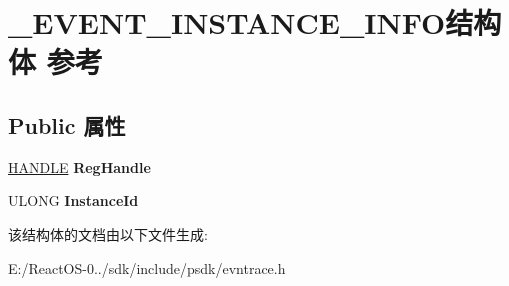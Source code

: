 \hypertarget{struct___e_v_e_n_t___i_n_s_t_a_n_c_e___i_n_f_o}{}\section{\+\_\+\+E\+V\+E\+N\+T\+\_\+\+I\+N\+S\+T\+A\+N\+C\+E\+\_\+\+I\+N\+F\+O结构体 参考}
\label{struct___e_v_e_n_t___i_n_s_t_a_n_c_e___i_n_f_o}
\subsection*{Public 属性}
\begin{DoxyCompactItemize}
\item 
\mbox{\label{struct___e_v_e_n_t___i_n_s_t_a_n_c_e___i_n_f_o_a291506bba725bff337ba5aabd95eb3f1}} 
\hyperlink{interfacevoid}{H\+A\+N\+D\+LE} {\bfseries Reg\+Handle}
\item 
\mbox{\label{struct___e_v_e_n_t___i_n_s_t_a_n_c_e___i_n_f_o_a77785ca241719cfc0c6a6c058636a916}} 
U\+L\+O\+NG {\bfseries Instance\+Id}
\end{DoxyCompactItemize}


该结构体的文档由以下文件生成\+:\begin{DoxyCompactItemize}
\item 
E\+:/\+React\+O\+S-\/0../sdk/include/psdk/evntrace.\+h\end{DoxyCompactItemize}
